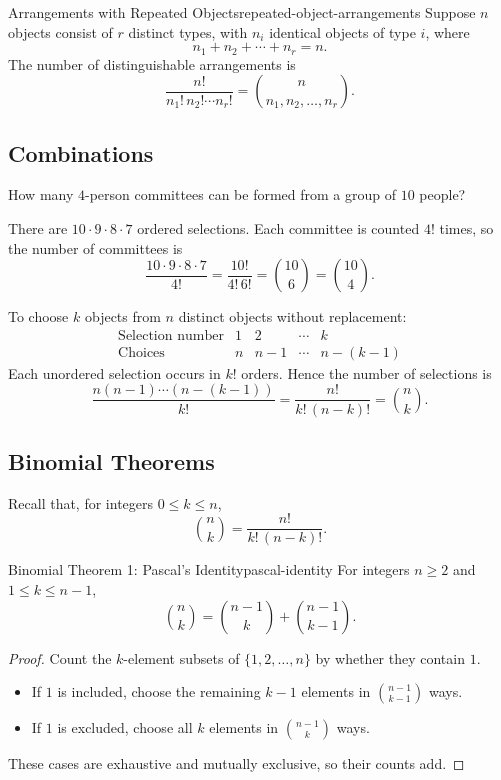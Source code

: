 \begin{theorem}{Arrangements with Repeated Objects}{repeated-object-arrangements}
  Suppose $n$ objects consist of $r$ distinct types, with $n_i$ identical objects of type $i$, where
  \[
    n_1+n_2+\cdots+n_r=n.
  \]
  The number of distinguishable arrangements is
  \[
    \frac{n!}{n_1!\,n_2!\cdots n_r!}
    = \binom{n}{n_1,n_2,\ldots,n_r}.
  \]
\end{theorem}

\subsection{Combinations}

\begin{example}
  How many $4$-person committees can be formed from a group of $10$ people?

  There are $10\cdot9\cdot8\cdot7$ ordered selections. Each committee is counted $4!$ times, so the number of committees is
  \[
    \frac{10\cdot9\cdot8\cdot7}{4!}
    = \frac{10!}{4!\,6!}
    = \binom{10}{6}
    = \binom{10}{4}.
  \]
\end{example}

To choose $k$ objects from $n$ distinct objects without replacement:
\[
  \begin{array}{c|cccc}
    \text{Selection number} & 1 & 2   & \cdots & k       \\
    \text{Choices}          & n & n-1 & \cdots & n-(k-1)
  \end{array}
\]
Each unordered selection occurs in $k!$ orders. Hence the number of selections is
\[
  \frac{n(n-1)\cdots(n-(k-1))}{k!}
  = \frac{n!}{k!\,(n-k)!}
  = \binom{n}{k}.
\]

\subsection{Binomial Theorems}

Recall that, for integers $0\le k\le n$,
\[
  \binom{n}{k}=\frac{n!}{k!\,(n-k)!}.
\]

\begin{theorem}{Binomial Theorem 1: Pascal's Identity}{pascal-identity}
  For integers $n\ge2$ and $1\le k\le n-1$,
  \[
    \binom{n}{k}=\binom{n-1}{k}+\binom{n-1}{k-1}.
  \]
\end{theorem}

\begin{proof}
  Count the $k$-element subsets of $\{1,2,\ldots,n\}$ by whether they contain $1$.
  \begin{itemize}
    \item If $1$ is included, choose the remaining $k-1$ elements in $\binom{n-1}{k-1}$ ways.
    \item If $1$ is excluded, choose all $k$ elements in $\binom{n-1}{k}$ ways.
  \end{itemize}
  These cases are exhaustive and mutually exclusive, so their counts add.
\end{proof}

